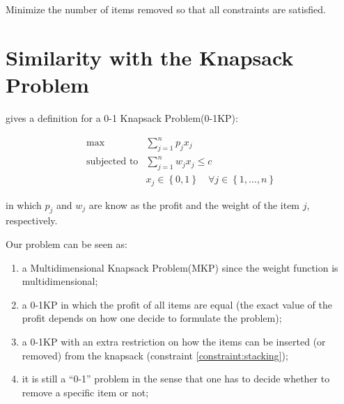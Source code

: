 \documentclass{article}
\newcommand{\subjectedTo}{\ensuremath{\mbox{subjected to}}\xspace}
\newcommand{\Set}[1]{\ensuremath{\left\{#1\right\}}}
\newcommand{\zoKPV}{0-1 Knapsack Problem\xspace}
\newcommand{\zoKP}{0-1KP\xspace}
\newcommand{\MKPV}{Multidimensional Knapsack Problem\xspace}
\newcommand{\MKP}{MKP\xspace}
\begin{document}
Minimize the number of items removed so that all constraints are satisfied.

\section{Similarity with the Knapsack Problem}

\cite{bib:knapsack-problems} gives a definition for a \zoKPV (\zoKP):

\begin{eqnarray}
	\label{problem:knapsack-problem}
	\max & \displaystyle\sum\limits_{j=1}^{n} p_j x_j \\
	\subjectedTo
		& \displaystyle\sum\limits_{j=1}^{n} w_j x_j \leq c \nonumber\\
		& x_j \in \Set{0, 1} \quad \forall j \in \Set{1, \dots, n} \nonumber
\end{eqnarray}

in which $p_j$ and $w_j$ are know as the profit and the weight of the item $j$, respectively.

Our problem can be seen as:

\begin{enumerate}
	\item a \MKPV (\MKP) since the weight function is multidimensional;
	\item a \zoKP in which the profit of all items are equal (the exact value of the profit depends on how one decide to formulate the problem);
	\item a \zoKP with an extra restriction on how the items can be inserted (or removed) from the knapsack (constraint \eqref{constraint:stacking});
	\item it is still a ``0-1'' problem in the sense that one has to decide whether to remove a specific item or not;
\end{enumerate}




\end{document}
